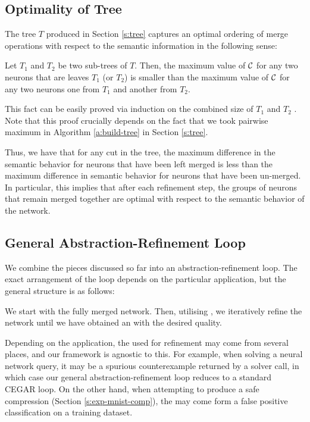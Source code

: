 

\subsection{Optimality of Tree}
\label{s:optimal-tree}

The tree $T$ produced in Section \ref{s:tree} captures an optimal ordering of
merge operations with respect to the semantic information in the following
sense:

Let $T_1$ and $T_2$ be two sub-trees of $T$. Then, the maximum value of $\mathcal{C}$
for any two neurons that are leaves $T_1$ (or $T_2$) is smaller than the maximum
value of $\mathcal{C}$ for any two neurons one from $T_1$ and another from $T_2$.

This fact can be easily proved via induction on the combined size of $T_1$ and
$T_2$ . Note that this proof crucially depends on the fact
that we took pairwise maximum in Algorithm \ref{a:build-tree} in Section
\ref{s:tree}.

Thus, we have that for any cut in the tree, the
maximum difference in the semantic behavior for neurons that have been left
merged is less than the maximum difference in semantic behavior for neurons that
have been un-merged. In particular, this implies that after each refinement
step, the groups of neurons that remain merged together are optimal with respect
to the semantic behavior of the network.

\subsection{General Abstraction-Refinement Loop}
\label{s:abs-ref-fw}

We combine the pieces discussed so far into an abstraction-refinement loop. The
exact arrangement of the loop depends on the particular application, but the
general structure is as follows:

We start with the fully merged network. Then, utilising \gencex, we iteratively
refine the network until we have obtained an \abs with the desired quality.

Depending on the application, the \gencex used for refinement may come from
several places, and our framework is agnostic to this. For example, when solving
a neural network query, it may be a spurious counterexample returned by a solver
call, in which case our general abstraction-refinement loop reduces to a
standard CEGAR loop. On the other hand, when attempting to produce a safe
compression (Section \ref{s:exp-mnist-comp}), the \gencex may come form a false
positive classification on a training dataset.
